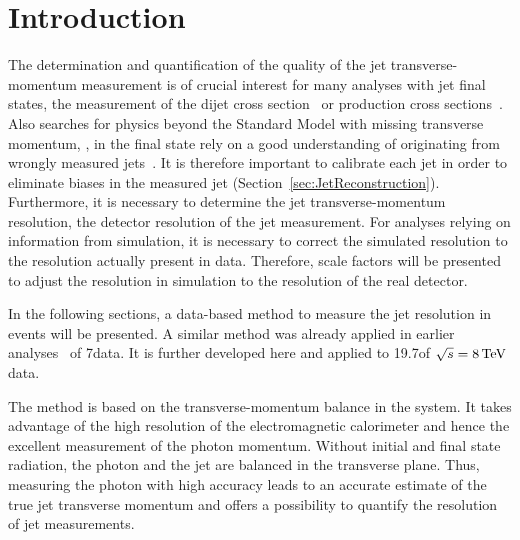 \chapter{Introduction}
\label{res:ch:Introduction}
The determination and quantification of the quality of the jet transverse-momentum measurement is of crucial interest for many analyses with jet final states, \eg the measurement of the dijet cross section~\cite{bib:CMS:QCD_measurements} or \ttbar production cross sections~\cite{bib:CMS:TopCrossSection_8TeV}. 
Also searches for physics beyond the Standard Model with missing transverse momentum, \PTm, in the final state rely on a good understanding of \PTm originating from wrongly measured jets~\cite{bib:CMS:RA2_8TeV,bib:CMS:MT2_8TeV,bib:CMS:AlphaT_8TeV}.
It is therefore important to calibrate each jet in order to eliminate biases in the measured jet \pt (Section~\ref{sec:JetReconstruction}).
Furthermore, it is necessary to determine the jet transverse-momentum resolution, \ie the detector resolution of the jet \pt measurement.
For analyses relying on information from simulation, it is necessary to correct the simulated resolution to the resolution actually present in data.
Therefore, scale factors will be presented to adjust the resolution in simulation to the resolution of the real detector.  
  
In the following sections, a data-based method to measure the jet \pt resolution in \GAMJET events will be presented. 
A similar method was already applied in earlier analyses~\cite{bib:CMS:JERCPaper_2011,CMS:PAS:JETResolution_7TeV} of 7\tev data.  
It is further developed here and applied to 19.7\fbinv of $\sqrt{s}=8\,\text{Te}\kern-0.06667em\text{V}$ data.

The method is based on the transverse-momentum balance in the \GAMJET system. 
It takes advantage of the high resolution of the electromagnetic calorimeter and hence the excellent measurement of the photon momentum.
Without initial and final state radiation, the photon and the jet are balanced in the transverse plane. 
Thus, measuring the photon \pt with high accuracy leads to an accurate estimate of the true jet transverse momentum and offers a possibility to quantify the resolution of jet \pt measurements.


